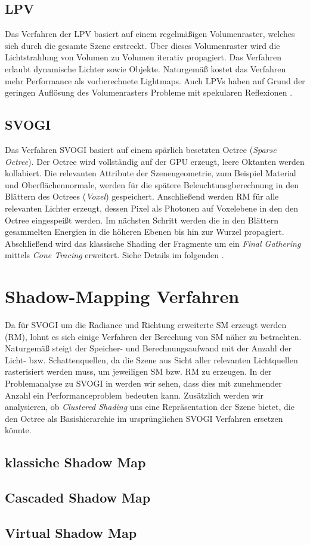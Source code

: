 \subsection{\ac{LPV}}

Das Verfahren der \ac{LPV} basiert auf einem regelmäßigen Volumenraster, welches sich durch die gesamte Szene erstreckt. Über dieses Volumenraster wird die Lichtstrahlung von Volumen zu Volumen iterativ propagiert. Das Verfahren erlaubt dynamische Lichter sowie Objekte. Naturgemäß kostet das Verfahren mehr Performance als vorberechnete Lightmaps. Auch LPVs haben auf Grund der geringen Auflösung des Volumenrasters Probleme mit spekularen Reflexionen \cite{kaplanyan2009light}.


\subsection{\acf{SVOGI}}

Das Verfahren \ac{SVOGI} basiert auf einem spärlich besetzten Octree (\textit{Sparse Octree}). Der Octree wird vollständig auf der GPU erzeugt, leere Oktanten werden kollabiert.  Die relevanten Attribute der Szenengeometrie, zum Beispiel Material und Oberflächennormale, werden für die spätere Beleuchtunsgberechnung in den Blättern des Octrees (\textit{Voxel}) gespeichert. Anschließend werden \ac{RM} für alle relevanten Lichter erzeugt, dessen Pixel als Photonen auf Voxelebene in den den Octree eingespeißt werden. Im nächsten Schritt werden die in den Blättern gesammelten Energien in die höheren Ebenen bis hin zur Wurzel propagiert. Abschließend wird das klassische Shading der Fragmente um ein \textit{Final Gathering} mittels \textit{Cone Tracing} erweitert. Siehe Details im folgenden .


\section{Shadow-Mapping Verfahren}

Da für \ac{SVOGI} um die Radiance und Richtung erweiterte \acf{SM} erzeugt werden (\acf{RM}), lohnt es sich einige Verfahren der Berechung von \ac{SM} näher zu betrachten. Naturgemäß steigt der Speicher- und Berechnungsaufwand mit der Anzahl der Licht- bzw. Schattenquellen, da die Szene aus Sicht aller relevanten Lichtquellen rasterisiert werden muss, um jeweiligen \ac{SM} bzw. \ac{RM} zu erzeugen. In der Problemanalyse zu \ac{SVOGI} in  werden wir sehen, dass dies mit zunehmender Anzahl ein Performanceproblem bedeuten kann. Zusätzlich werden wir analysieren, ob \textit{Clustered Shading} uns eine Repräsentation der Szene bietet, die den Octree als Basishierarchie im ursprünglichen \ac{SVOGI} Verfahren ersetzen könnte.

\subsection{klassiche Shadow Map}
\blindtext

\subsection{Cascaded Shadow Map}
\blindtext

\subsection{Virtual Shadow Map}
\blindtext